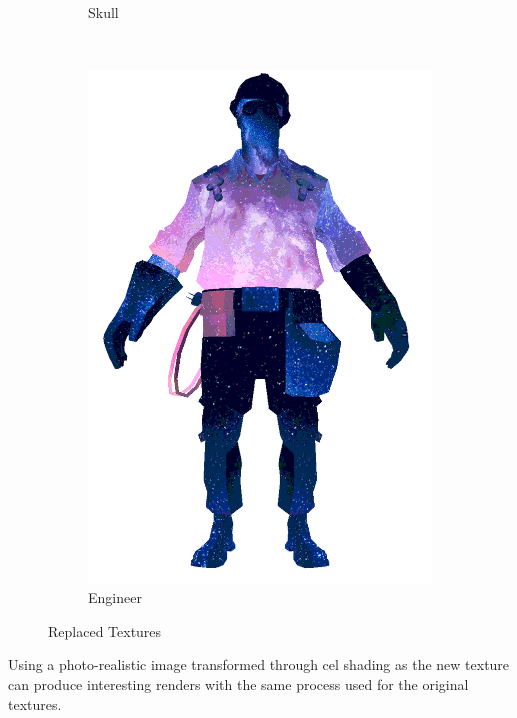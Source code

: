 \begin{figure}[h]
\begin{subfigure}[b]{0.25\textwidth}
        \caption{Skull}
        \label{fig:TextureReplacementSkull}
    \end{subfigure}
     ~
    \centering
    \begin{subfigure}[b]{0.2\textwidth}
        \includegraphics[width=\textwidth]{img/textures/TextureReplacement.png}
        \caption{Engineer}
        \label{fig:TextureReplacement}
    \end{subfigure}
    \caption{Replaced Textures}
    \label{fig:TexturesReplacement}
\end{figure}

Using a photo-realistic image transformed through cel shading as the new texture can produce interesting renders with the same process used for the original textures.

